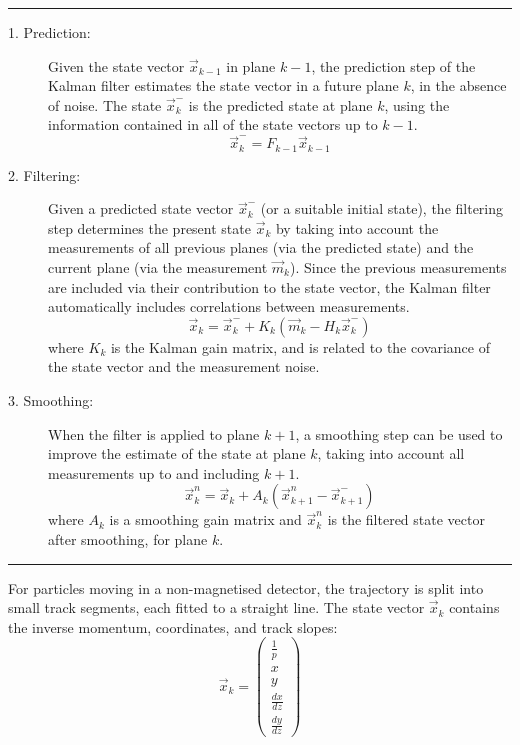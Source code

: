 \vspace{1em}\hrule\vspace{1em}
\begin{description}
    \item[1. Prediction:] Given the state vector $\vec{x}_{k-1}$ in plane $k-1$, the prediction step of the Kalman filter estimates the state vector in a future plane $k$, in the absence of noise. The state $\vec{x}_k^{-}$ is the predicted state at plane $k$, using the information contained in all of the state vectors up to $k-1$.
    \begin{equation}\label{eqn:kalman_prediction_step}
        \vec{x}_k^{-} = F_{k-1} \vec{x}_{k-1}
    \end{equation}

    \item[2. Filtering:] Given a predicted state vector $\vec{x}_k^{-}$ (or a suitable initial state), the filtering step determines the present state $\vec{x}_k$ by taking into account the measurements of all previous planes (via the predicted state) and the current plane (via the measurement $\vec{m}_k$). Since the previous measurements are included via their contribution to the state vector, the Kalman filter automatically includes correlations between measurements.
    \begin{equation}\label{eqn:kalman_filtering_step}
        \vec{x}_k = \vec{x}_k^{-} + K_k \left(\vec{m}_k - H_k\vec{x}_k^{-} \right)
    \end{equation}
    where $K_k$ is the Kalman gain matrix, and is related to the covariance of the state vector and the measurement noise.

    \item[3. Smoothing:] When the filter is applied to plane $k+1$, a smoothing step can be used to improve the estimate of the state at plane $k$, taking into account all measurements up to and including $k+1$.
    \begin{equation}
        \vec{x}_k^{n} = \vec{x}_k + A_k \left(\vec{x}_{k+1}^n - \vec{x}_{k+1}^{-}\right)
    \end{equation}
    where $A_k$ is a smoothing gain matrix and $\vec{x}_k^n$ is the filtered state vector after smoothing, for plane $k$.
\end{description}
\vspace{1em}\hrule\vspace{1em}

For particles moving in a non-magnetised detector, the trajectory is split into small track segments, each fitted to a straight line. The state vector $\vec{x}_k$ contains the inverse momentum, coordinates, and track slopes:
\begin{equation}\label{eqn:kalman_state_vector}
    \vec{x}_k = \left( \begin{array}{c} \frac{1}{p} \\ x \\ y \\ \frac{dx}{dz} \\ \frac{dy}{dz} \end{array} \right)
\end{equation}

